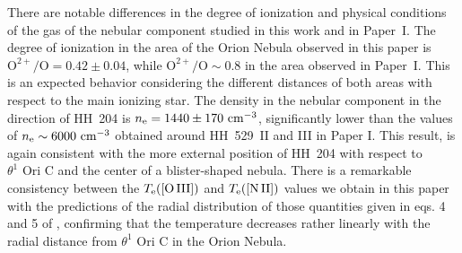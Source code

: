 \documentclass[twocolumn,linenumbers]{aastex63}
\begin{document}
There are notable differences in the degree of ionization and physical conditions of the gas of the nebular component studied in this work and in Paper~I. The degree of ionization in the area of the Orion Nebula observed in this paper is  $\text{O}^{2+}/\text{O}=0.42 \pm 0.04$, while $\text{O}^{2+}/\text{O} \sim 0.8$ in the area observed in Paper~I. This is an expected behavior considering the different distances of both areas with respect to the main ionizing star. The density in the nebular component in the direction of HH~204 is $n_{\rm e}=1440 \pm 170 \text{ cm}^{-3}$, significantly lower than the values of $n_{\rm e}\sim 6000\text{ cm}^{-3}$ obtained around HH~529~II and III in Paper I. This result, is again consistent with the more external position of HH~204 with respect to $\theta^{1} \text{ Ori C}$ and the center of a blister-shaped nebula. There is a remarkable consistency between the $T_{\rm e}(\text{[O\thinspace III]})$ and $T_{\rm e}(\text{[N\thinspace II]})$ values we obtain in this paper with the predictions of the radial distribution of those quantities given in eqs. 4 and 5 of  \citet{mesadelgado08}, confirming that the temperature decreases rather linearly with the radial distance from $\theta^{1} \text{ Ori C}$ in the Orion Nebula. 
\end{document}
